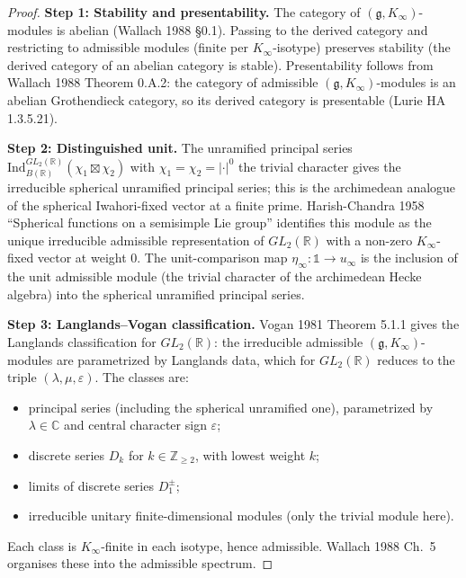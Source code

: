 \begin{proof}
\textbf{Step 1: Stability and presentability.} The category of
\((\mathfrak{g}, K_{\infty})\)-modules is abelian (Wallach 1988
\S0.1). Passing to the derived category and restricting to admissible
modules (finite per \(K_{\infty}\)-isotype) preserves stability (the
derived category of an abelian category is stable). Presentability
follows from Wallach 1988 Theorem 0.A.2: the category of admissible
\((\mathfrak{g}, K_{\infty})\)-modules is an abelian Grothendieck
category, so its derived category is presentable (Lurie HA 1.3.5.21).

\textbf{Step 2: Distinguished unit.} The unramified principal series
\(\mathrm{Ind}_{B(\mathbb{R})}^{GL_{2}(\mathbb{R})}(\chi_{1} \boxtimes \chi_{2})\)
with \(\chi_{1} = \chi_{2} = |\cdot|^{0}\) the trivial character gives
the irreducible spherical unramified principal series; this is the
archimedean analogue of the spherical Iwahori-fixed vector at a
finite prime. Harish-Chandra 1958 ``Spherical functions on a
semisimple Lie group'' identifies this module as the unique irreducible
admissible representation of \(GL_{2}(\mathbb{R})\) with a non-zero
\(K_{\infty}\)-fixed vector at weight \(0\). The unit-comparison map
\(\eta_{\infty}: \mathbb{1} \to u_{\infty}\) is the inclusion of the
unit admissible module (the trivial character of the archimedean
Hecke algebra) into the spherical unramified principal series.

\textbf{Step 3: Langlands--Vogan classification.} Vogan 1981
Theorem 5.1.1 gives the Langlands classification for \(GL_{2}(\mathbb{R})\):
the irreducible admissible \((\mathfrak{g}, K_{\infty})\)-modules are
parametrized by Langlands data, which for \(GL_{2}(\mathbb{R})\)
reduces to the triple \((\lambda, \mu, \varepsilon)\). The classes are:
\begin{itemize}
\item principal series (including the spherical unramified one),
parametrized by \(\lambda \in \mathbb{C}\) and central character
sign \(\varepsilon\);
\item discrete series \(D_{k}\) for \(k \in \mathbb{Z}_{\geq 2}\), with
lowest weight \(k\);
\item limits of discrete series \(D_{1}^{\pm}\);
\item irreducible unitary finite-dimensional modules (only the
trivial module here).
\end{itemize}
Each class is \(K_{\infty}\)-finite in each isotype, hence admissible.
Wallach 1988 Ch.\ 5 organises these into the admissible spectrum.


\end{proof}

